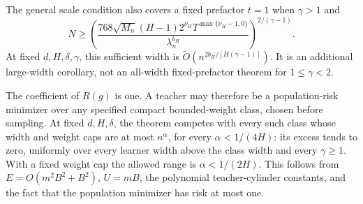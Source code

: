 The general scale condition also covers a fixed prefactor $t=1$
when $\gamma>1$ and
\[
 N\geq\left(\frac{768\sqrt{M_n}(H-1)2^{\nu_H}
                          T^{\max\{\nu_H-1,0\}}}
                         {\lambda_n^{b_H}}\right)^{2/(\gamma-1)}.
\]
At fixed $d,H,\delta,\gamma$, this sufficient width is
$\widetilde O(n^{2b_H/[H(\gamma-1)]})$.  It is an additional large-width
corollary, not an all-width fixed-prefactor theorem for
$1\leq\gamma<2$.

The coefficient of $R(g)$ is one.  A teacher may therefore be a
population-risk minimizer over any specified compact bounded-weight
class, chosen before sampling.  At fixed $d,H,\delta$, the theorem
competes with every such class whose width and weight caps are at most
$n^\alpha$, for every $\alpha<1/(4H)$: its excess tends to zero,
uniformly over every learner width above the class width and every
$\gamma\geq1$.  With a fixed weight cap the allowed range is
$\alpha<1/(2H)$.  This follows from $E=O(m^2B^2+B^2)$,
$U=mB$, the polynomial teacher-cylinder constants, and the fact that
the population minimizer has risk at most one.
